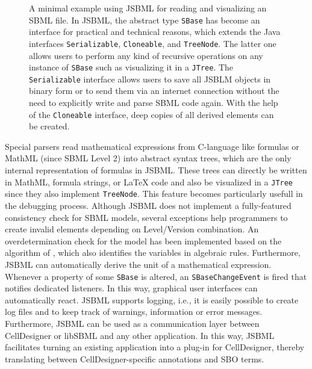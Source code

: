 \documentclass{bioinfo}
\begin{document}
\begin{methods}
\begin{figure}
{{{{      }
    }
  }\hfill
}
\caption[A minimal example using JSBML for reading and visualizing an SBML file using JSBML]{
A minimal example using JSBML for reading and visualizing an SBML file. In JSBML, the abstract type \texttt{SBase} has
become an interface for practical and technical reasons, which extends the Java interfaces \texttt{Serializable},
\texttt{Cloneable}, and \texttt{TreeNode}. The latter one allows users to perform any kind of recursive operations
on any instance of \texttt{SBase} such as visualizing it in a \texttt{JTree}.
The \texttt{Serializable} interface allows users to save all JSBLM objects in binary form or to send 
them via an internet connection without the need to explicitly write and parse SBML code again. With 
the help of the \texttt{Cloneable} interface, deep copies of all derived elements can be created.}
\label{fig:JSBML}
\end{figure}
Special parsers read mathematical expressions from C-language like formulas or MathML 
(since SBML Level 2) into abstract syntax trees, which are the only internal representation
of formulas in JSBML.
These trees can directly be written in MathML, formula strings, or \LaTeX{} code and 
also be visualized in a \texttt{JTree} since they also implement \texttt{TreeNode}. 
This feature becomes particularly usefull in the debugging process.
Although JSBML does not implement a fully-featured consistency check for SBML
models, several exceptions help programmers to create invalid elements depending on 
Level/Version combination. An overdetermination check for the model has been
implemented based on the algorithm of \citet{Hopcroft1973}, which also identifies the variables 
in algebraic rules. Furthermore, JSBML can automatically derive the unit of a mathematical expression.
Whenever a property of some \texttt{SBase} is altered, an \texttt{SBaseChangeEvent} is fired
that notifies dedicated listeners. In this way, graphical user interfaces can automatically react.
JSBML supports logging, i.e., it is easily possible to create log files and to keep track of warnings,
information or error messages. Furthermore, JSBML can be used as a communication layer between 
CellDesigner \citep{Funahashi2003} or libSBML and any other application. In this way, JSBML 
facilitates turning an existing application into a plug-in for CellDesigner, thereby translating 
between CellDesigner-specific annotations and SBO terms.
\end{methods}
\end{document}
